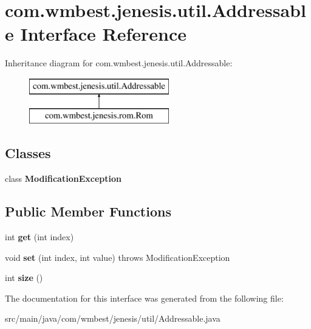 \hypertarget{interfacecom_1_1wmbest_1_1jenesis_1_1util_1_1Addressable}{\section{com.\-wmbest.\-jenesis.\-util.\-Addressable Interface Reference}
\label{interfacecom_1_1wmbest_1_1jenesis_1_1util_1_1Addressable}
}
Inheritance diagram for com.\-wmbest.\-jenesis.\-util.\-Addressable\-:\begin{figure}[H]
\begin{center}
\leavevmode
\includegraphics[height=2.000000cm]{interfacecom_1_1wmbest_1_1jenesis_1_1util_1_1Addressable}
\end{center}
\end{figure}
\subsection*{Classes}
\begin{DoxyCompactItemize}
\item 
class {\bfseries Modification\-Exception}
\end{DoxyCompactItemize}
\subsection*{Public Member Functions}
\begin{DoxyCompactItemize}
\item 
\hypertarget{interfacecom_1_1wmbest_1_1jenesis_1_1util_1_1Addressable_a377a40c38f0107f2a1eef13295bc23e4}{int {\bfseries get} (int index)}\label{interfacecom_1_1wmbest_1_1jenesis_1_1util_1_1Addressable_a377a40c38f0107f2a1eef13295bc23e4}

\item 
\hypertarget{interfacecom_1_1wmbest_1_1jenesis_1_1util_1_1Addressable_adf6ae5be6d3c53712f326c5ee1da2b57}{void {\bfseries set} (int index, int value)  throws Modification\-Exception}\label{interfacecom_1_1wmbest_1_1jenesis_1_1util_1_1Addressable_adf6ae5be6d3c53712f326c5ee1da2b57}

\item 
\hypertarget{interfacecom_1_1wmbest_1_1jenesis_1_1util_1_1Addressable_a4e1776d193f1a9b166140ea1b2ecf1e6}{int {\bfseries size} ()}\label{interfacecom_1_1wmbest_1_1jenesis_1_1util_1_1Addressable_a4e1776d193f1a9b166140ea1b2ecf1e6}

\end{DoxyCompactItemize}


The documentation for this interface was generated from the following file\-:\begin{DoxyCompactItemize}
\item 
src/main/java/com/wmbest/jenesis/util/Addressable.\-java\end{DoxyCompactItemize}
